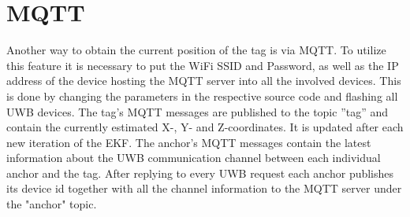 \chapter{MQTT}
Another way to obtain the current position of the tag is via MQTT. 
To utilize this feature it is necessary to put the WiFi SSID and Password, as well as the IP address of the device hosting the MQTT server into all the involved devices. 
This is done by changing the parameters in the respective source code and flashing all UWB devices. 
\vspace{4pt}
\newline
The tag's MQTT messages are published to the topic ''tag'' and contain the currently estimated X-, Y- and Z-coordinates. 
It is updated after each new iteration of the EKF. 
\vspace{4pt}
\newline
The anchor's MQTT messages contain the latest information about the UWB communication channel between each individual anchor and the tag. 
After replying to every UWB request each anchor publishes its device id together with all the channel information to the MQTT server under the "anchor" topic. 

